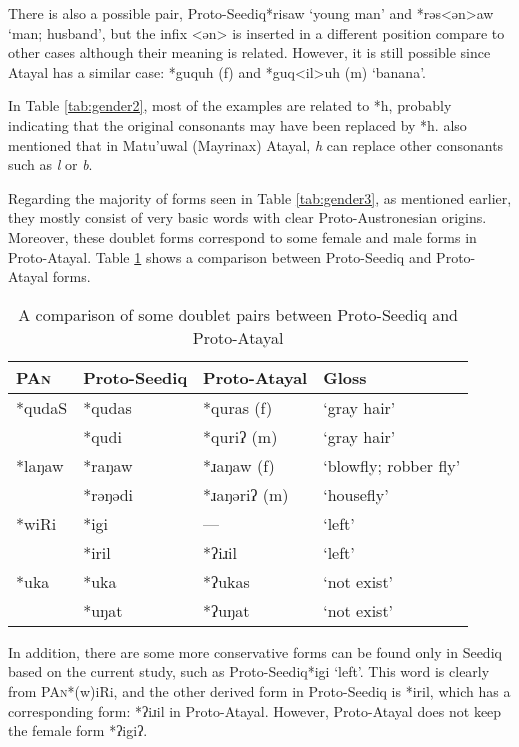 \documentclass[12pt]{article}
\newcommand{\pan}{\textsc{PAn}\xspace}
\newcommand{\pataf}{Proto-Atayal\xspace}
\newcommand{\psedf}{Proto-Seediq\xspace}
\begin{document}
There is also a possible pair, \psedf *risaw `young man' and *rəs<ən>aw `man; husband', but the infix <ən> is inserted in a different position compare to other cases although their meaning is related. However, it is still possible since Atayal has a similar case: *guquh (f) and *guq<il>uh (m) `banana'.

In Table \ref{tab:gender2}, most of the examples are related to *h, probably indicating that the original consonants may have been replaced by *h. \textcite{li1983gender} also mentioned that in Matu'uwal (Mayrinax) Atayal, \textit{h} can replace other consonants such as \textit{l} or \textit{b}.

Regarding the majority of forms seen in Table \ref{tab:gender3}, as mentioned earlier, they mostly consist of very basic words with clear Proto-Austronesian origins. Moreover, these doublet forms correspond to some female and male forms in \pataf. Table \ref{tab:gender4} shows a comparison between \psedf and \pataf forms.

\begin{table}[!htbp]
\centering
\caption{A comparison of some doublet pairs between \psedf and \pataf}
\label{tab:gender4}
\begin{tabular}{llll}
\hline
\pan   & \psedf  & \pataf       & Gloss                 \\ \hline
*qudaS & *qudas  & *quras (f)   & `gray hair'           \\
       & *qudi   & *quriʔ (m)   & `gray hair'           \\
*laŋaw & *raŋaw  & *ɹaŋaw (f)   & `blowfly; robber fly' \\
       & *rəŋədi & *ɹaŋəriʔ (m) & `housefly'            \\
*wiRi  & *igi    & ---          & `left'                \\
       & *iril   & *ʔiɹil       & `left'                \\
*uka   & *uka    & *ʔukas        & `not exist'           \\
       & *uŋat   & *ʔuŋat       & `not exist'           \\ \hline
\end{tabular}
\end{table}

In addition, there are some more conservative forms can be found only in Seediq based on the current study, such as \psedf *igi `left'. This word is clearly from \pan *(w)iRi, and the other derived form in \psedf is *iril, which has a corresponding form: *ʔiɹil in Proto-Atayal. However, Proto-Atayal does not keep the female form *ʔigiʔ. 
\end{document}
